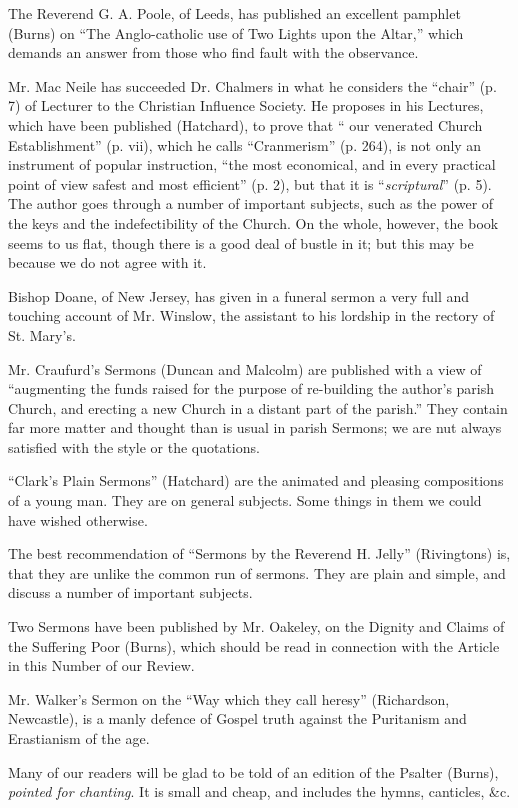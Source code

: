 The Reverend G. A. Poole, of Leeds, has published
an excellent pamphlet (Burns) on ``The Anglo-catholic use of Two Lights
upon the Altar,'' which demands an answer from those who find fault with
the observance.

Mr. Mac Neile has succeeded Dr. Chalmers in what he
considers the ``chair'' (p. 7) of Lecturer to the Christian Influence
Society. He proposes in his Lectures, which have been published (Hatchard),
to prove that `` our venerated Church Establishment'' (p. vii), which he
calls ``Cranmerism'' (p. 264), is not only an instrument of popular
instruction, ``the most economical, and in every practical point of view
safest and most efficient'' (p. 2), but that it is ``\emph{scriptural}''
(p. 5). The author goes through a number of important subjects, such as
the power of the keys and the indefectibility of the Church. On the
whole, however, the book seems to us flat, though there is a good deal
of bustle in it; but this may be because we do not agree with it.

Bishop Doane, of New Jersey, has given in a funeral
sermon a very full and touching account of Mr. Winslow, the assistant to
his lordship in the rectory of St. Mary's.

Mr. Craufurd's Sermons (Duncan and Malcolm) are
published with a view of ``augmenting the funds raised for the purpose of
re-building the author's parish Church, and erecting a new Church in a
distant part of the parish.'' They contain far more matter and thought
than is usual in parish Sermons; we are nut always satisfied with the
style or the quotations.

``Clark's Plain Sermons'' (Hatchard) are the
animated and pleasing compositions of a young man. They are on
general subjects. Some things in them we could have wished otherwise.

The best recommendation of ``Sermons by the Reverend
H. Jelly'' (Rivingtons) is, that they are unlike the common run of
sermons. They are plain and simple, and discuss a number of important
subjects.

Two Sermons have been published by Mr. Oakeley, on
the Dignity and Claims of the Suffering Poor (Burns), which should be
read in connection with the Article in this Number of our Review.

Mr. Walker's Sermon on the ``Way which they call
heresy'' (Richardson, Newcastle), is a manly defence of Gospel truth
against the Puritanism and Erastianism of the age.

Many of our readers will be glad to be told of an
edition of the Psalter (Burns), \emph{pointed for chanting}. It is small
and cheap, and includes the hymns, canticles, \&c.

